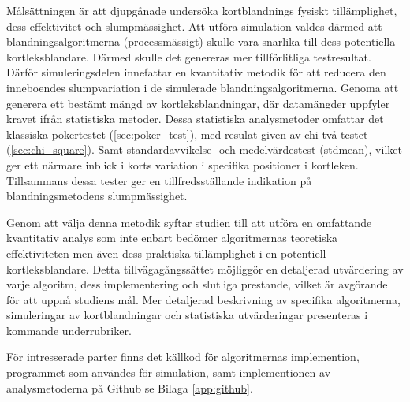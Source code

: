 \documentclass[swedish,a4paper]{article}
\begin{document}
Målsättningen är att djupgånade undersöka kortblandnings
fysiskt tillämplighet, dess effektivitet och slumpmässighet. Att utföra 
simulation valdes därmed att blandningsalgoritmerna
(processmässigt) skulle vara snarlika till dess potentiella kortleks\-blandare.
Därmed skulle det genereras mer tillförlitliga testresultat. Därför simuleringsdelen
innefattar en kvantitativ metodik för att reducera den inneboendes
slumpvariation i de simulerade blandningsalgoritmerna. Genoma att generera ett bestämt
mängd av kortleksblandningar, där datamängder uppfyler kravet ifrån statistiska metoder. Dessa
statistiska  analysmetoder omfattar det klassiska pokertestet (\ref{sec:poker_test}), med
resulat given av chi-två-testet (\ref{sec:chi_square}). Samt standardavvikelse- och medelvärdestest (\gls{stdmean}), vilket ger ett närmare inblick i korts variation i specifika
positioner i kortleken. Tillsammans dessa tester ger en tillfredsställande indikation på
blandningsmetodens slumpmässighet. 

Genom att välja denna metodik syftar studien till att utföra en omfattande
kvantitativ analys som inte enbart bedömer algoritmernas teoretiska
effektiviteten men även dess praktiska tillämplighet i en potentiell kortleks\-blandare.
Detta tillvägagångssättet möjliggör en detaljerad utvärdering av varje algoritm,
dess implementering och slutliga prestande, vilket är avgörande för att uppnå
studiens mål. Mer detaljerad beskrivning av specifika algoritmerna,
simuleringar av kortblandningar och statistiska utvärderingar presenteras i kommande 
underrubriker. 

För intresserade parter finns det källkod för algoritmernas implemention,
programmet som användes för simulation, samt implementionen av analysmetoderna
på Github se Bilaga \ref{app:github}.

%
%
\end{document}
